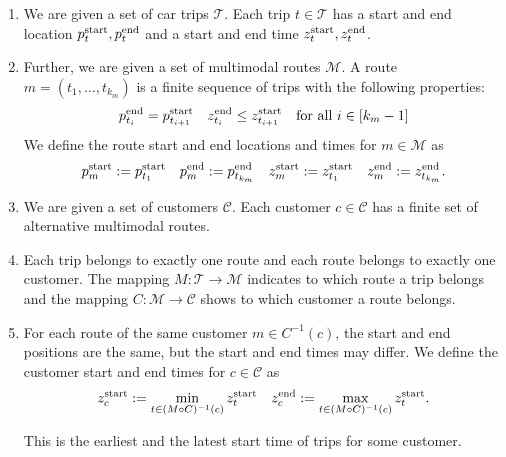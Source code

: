 \begin{definition}
\label{def:trips_routes_customers}

\begin{enumerate}
	\item
We are given a set of car trips $\mathcal{T}$. Each trip $t\in\mathcal{T}$ has a start and end location $p^{\operatorname{start}}_t, p^{\operatorname{end}}_t$ and a start and end time $z^{\operatorname{start}}_t, z^{\operatorname{end}}_t$.

	\item
Further, we are given a set of multimodal routes $\mathcal{M}$. A route ${m=\left(t_1,\dots,t_{k_m}\right)}$ is a finite sequence of trips with the following properties:
\begin{align*}
	p^{\operatorname{end}}_{t_i} = p^{\operatorname{start}}_{t_{i+1}} && z^{\operatorname{end}}_{t_i} \leq z^{\operatorname{start}}_{t_{i+1}} && \text{for all } i\in[k_m-1]
\end{align*}	
We define the route start and end locations and times for $m\in\mathcal{M}$ as
\begin{align*}
	p^{\operatorname{start}}_m := p^{\operatorname{start}}_{t_1} & &  p^{\operatorname{end}}_m := p^{\operatorname{end}}_{t_{k_m}} & & z^{\operatorname{start}}_m := z^{\operatorname{start}}_{t_1} & & z^{\operatorname{end}}_m := z^{\operatorname{end}}_{t_{k_m}}.
\end{align*}

	\item
We are given a set of customers $\mathcal{C}$. Each customer $c\in\mathcal{C}$ has a finite set of alternative multimodal routes.

	\item
Each trip belongs to exactly one route and each route belongs to exactly one customer. The mapping $M:\mathcal{T}\to\mathcal{M}$ indicates to which route a trip belongs and the mapping $C:\mathcal{M}\to\mathcal{C}$ shows to which customer a route belongs.	

	\item
For each route of the same customer $m\in C^{-1}(c)$, the start and end positions are the same, but the start and end times may differ. We define the customer start and end times for $c\in\mathcal{C}$ as
\begin{align*}
	z^{\operatorname{start}}_c := \min_{t\in (M\circ C)^{-1}(c)}z^{\operatorname{start}}_t & & z^{\operatorname{end}}_c := \max_{t\in (M\circ C)^{-1}(c)}z^{\operatorname{start}}_t .
\end{align*}

This is the earliest and the latest start time of trips for some customer.
\end{enumerate}

\end{definition}

